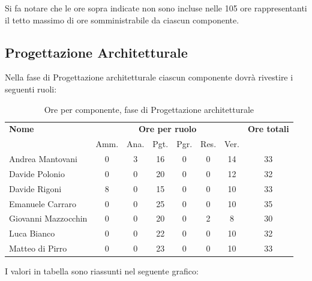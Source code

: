 Si fa notare che le ore sopra indicate non sono incluse nelle 105 ore rappresentanti il tetto massimo di ore somministrabile da ciascun componente.


\pagebreak
\subsection{Progettazione Architetturale}
Nella fase di Progettazione architetturale ciascun componente dovrà rivestire i seguenti ruoli:

\begin{table}[H]
\begin{tabular}{lccccccc}
\toprule
    \textbf{Nome}  & \multicolumn{6}{c}{\textbf{Ore per ruolo}} & \textbf{Ore totali} \\
     & Amm. & Ana. & Pgt. & Pgr. & Res. & Ver. & \\
    \midrule
    
	   Andrea Mantovani & 0 & 3 & 16 & 0 & 0 & 14 & 33 \\
	     Davide Polonio & 0 & 0 & 20 & 0 & 0 & 12 & 32 \\
	      Davide Rigoni & 8 & 0 & 15 & 0 & 0 & 10 & 33 \\
	   Emanuele Carraro & 0 & 0 & 25 & 0 & 0 & 10 & 35 \\
	Giovanni Mazzocchin & 0 & 0 & 20 & 0 & 2 & 8 & 30 \\
	        Luca Bianco & 0 & 0 & 22 & 0 & 0 & 10 & 32 \\
	    Matteo di Pirro & 0 & 0 & 23 & 0 & 0 & 10 & 33 \\
    
    \bottomrule
\end{tabular}
\caption{Ore per componente, fase di Progettazione architetturale}
\end{table}

I valori in tabella sono riassunti nel seguente grafico: \\ 

